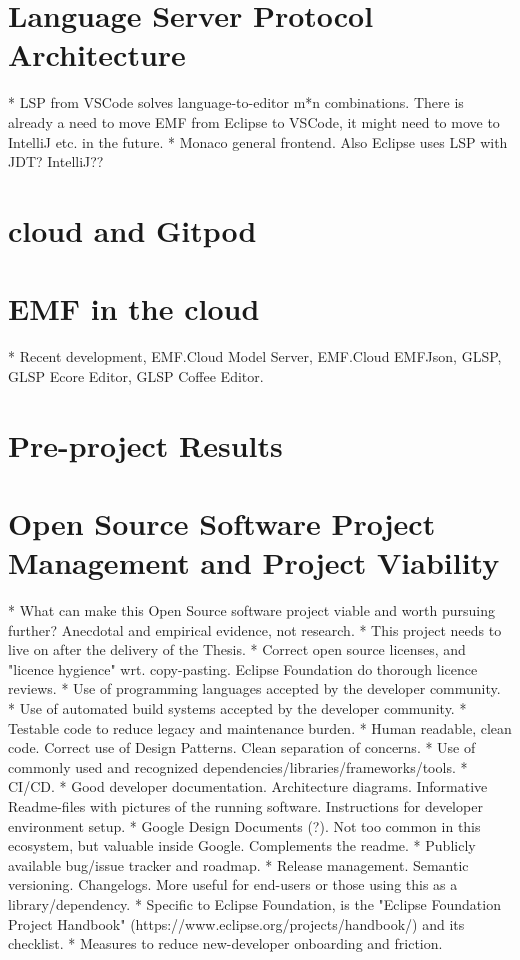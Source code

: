 \section{Language Server Protocol Architecture}\label{sec:lsp}
* LSP from VSCode solves language-to-editor m*n combinations. There is already a need to move EMF from Eclipse to VSCode, it might need to move to IntelliJ etc. in the future.
* Monaco general frontend. Also Eclipse uses LSP with JDT? IntelliJ??

\section{\Gls{cloud} and \gls{Gitpod}}

\section{\acrlong{EMF} in the \Gls{cloud}}
* Recent development, EMF.Cloud Model Server, EMF.Cloud EMFJson, GLSP, GLSP Ecore Editor, GLSP Coffee Editor.

\section{Pre-project Results}




\section{Open Source Software Project Management and Project Viability}

* What can make this Open Source software project viable and worth pursuing further? Anecdotal and empirical evidence, not research.
  * This project needs to live on after the delivery of the Thesis.
  * Correct open source licenses, and "licence hygience" wrt. copy-pasting. Eclipse Foundation do thorough licence reviews.
  * Use of programming languages accepted by the developer community.
  * Use of automated build systems accepted by the developer community.
  * Testable code to reduce legacy and maintenance burden.
  * Human readable, clean code. Correct use of Design Patterns. Clean separation of concerns.
  * Use of commonly used and recognized dependencies/libraries/frameworks/tools.
  * CI/CD.
  * Good developer documentation. Architecture diagrams. Informative Readme-files with pictures of the running software. Instructions for developer environment setup.
  * Google Design Documents (?). Not too common in this ecosystem, but valuable inside Google. Complements the readme.
  * Publicly available bug/issue tracker and roadmap.
  * Release management. Semantic versioning. Changelogs. More useful for end-users or those using this as a library/dependency.
  * Specific to Eclipse Foundation, is the "Eclipse Foundation Project Handbook" (https://www.eclipse.org/projects/handbook/) and its checklist.
  * Measures to reduce new-developer onboarding and friction.
